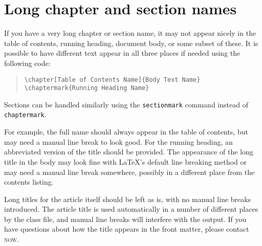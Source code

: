 \documentclass[openany]{now} %
\newcommand{\now}{\textsc{now}}
\begin{document}
\section{Long chapter and section names}

If you have a very long chapter or section name, it may not appear nicely
in the table of contents, running heading, document body, or some subset of these.
It is possible to have different text appear in all three places if needed
using the following code:
\begin{quote}
\begin{verbatim}
\chapter[Table of Contents Name]{Body Text Name}
\chaptermark{Running Heading Name}
\end{verbatim}
\end{quote}
Sections can be handled similarly using the \texttt{sectionmark} command
instead of \texttt{chaptermark}.

For example, the full name should always appear in the table of contents, but
may need a manual line break to look good. For the running heading,
an abbreviated version of the title should be provided. The appearance of the long
title in the body may look fine with \LaTeX's default line breaking method
or may need a manual line break somewhere, possibly in a different place from
the contents listing.

Long titles for the article itself should be left as is, with no manual line
breaks introduced. The article title is used automatically in a
number of different places by the class file, and manual line breaks will
interfere with the output. If you have questions about how the title appears
in the front matter, please contact \now.

\backmatter  %



\end{document}
